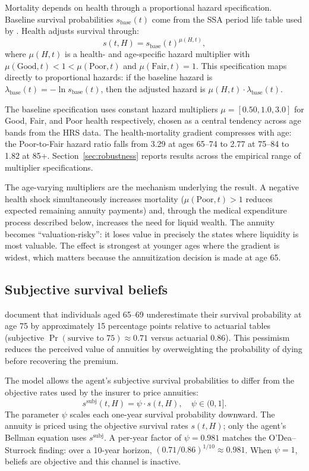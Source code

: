 \documentclass[12pt]{article}
\begin{document}
Mortality depends on health through a proportional hazard specification. Baseline survival probabilities $s_{\text{base}}(t)$ come from the SSA period life table used by \citet{lockwood2012}. Health adjusts survival through:
\begin{equation}
\label{eq:survival}
s(t, H) = s_{\text{base}}(t)^{\mu(H, t)},
\end{equation}
where $\mu(H, t)$ is a health- and age-specific hazard multiplier with $\mu(\text{Good}, t) < 1 < \mu(\text{Poor}, t)$ and $\mu(\text{Fair}, t) = 1$. This specification maps directly to proportional hazards: if the baseline hazard is $\lambda_{\text{base}}(t) = -\ln s_{\text{base}}(t)$, then the adjusted hazard is $\mu(H, t) \cdot \lambda_{\text{base}}(t)$.

The baseline specification uses constant hazard multipliers $\mu = [0.50, 1.0, 3.0]$ for Good, Fair, and Poor health respectively, chosen as a central tendency across age bands from the HRS data. The health-mortality gradient compresses with age: the Poor-to-Fair hazard ratio falls from 3.29 at ages 65--74 to 2.77 at 75--84 to 1.82 at 85+. Section~\ref{sec:robustness} reports results across the empirical range of multiplier specifications.

The age-varying multipliers are the mechanism underlying the \citet{reichlingsmetters2015} result. A negative health shock simultaneously increases mortality ($\mu(\text{Poor}, t) > 1$ reduces expected remaining annuity payments) and, through the medical expenditure process described below, increases the need for liquid wealth. The annuity becomes ``valuation-risky'': it loses value in precisely the states where liquidity is most valuable. The effect is strongest at younger ages where the gradient is widest, which matters because the annuitization decision is made at age 65.

\subsection{Subjective survival beliefs}

\citet{odeasturrock2023} document that individuals aged 65--69 underestimate their survival probability at age 75 by approximately 15 percentage points relative to actuarial tables (subjective $\Pr(\text{survive to 75}) \approx 0.71$ versus actuarial 0.86). This pessimism reduces the perceived value of annuities by overweighting the probability of dying before recovering the premium.

The model allows the agent's subjective survival probabilities to differ from the objective rates used by the insurer to price annuities:
\begin{equation}
\label{eq:pessimism}
s^{\text{subj}}(t, H) = \psi \cdot s(t, H), \quad \psi \in (0, 1].
\end{equation}
The parameter $\psi$ scales each one-year survival probability downward. The annuity is priced using the objective survival rates $s(t, H)$; only the agent's Bellman equation uses $s^{\text{subj}}$. A per-year factor of $\psi = 0.981$ matches the O'Dea--Sturrock finding: over a 10-year horizon, $(0.71/0.86)^{1/10} \approx 0.981$. When $\psi = 1$, beliefs are objective and this channel is inactive.
\end{document}
